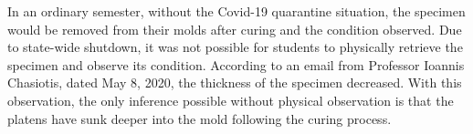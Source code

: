 In an ordinary semester, without the Covid-19 quarantine situation, the specimen would be removed from their molds after curing and the condition observed.  Due to state-wide shutdown, it was not possible for students to physically retrieve the specimen and observe its condition.  According to an email from Professor Ioannis Chasiotis, dated May 8, 2020, the thickness of the specimen decreased.  With this observation, the only inference possible without physical observation is that the platens have sunk deeper into the mold following the curing process.
